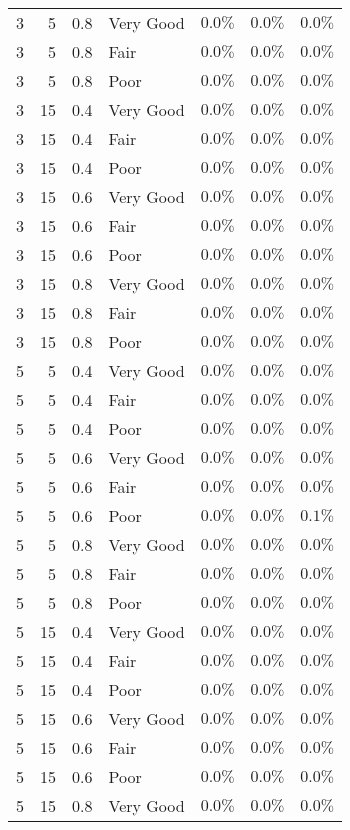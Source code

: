 \begin{longtable}{rrrlrrr}
3 & 5 & 0.8 & Very Good & $0.0\%$ & $0.0\%$ & $0.0\%$ \\ 
3 & 5 & 0.8 & Fair & $0.0\%$ & $0.0\%$ & $0.0\%$ \\ 
3 & 5 & 0.8 & Poor & $0.0\%$ & $0.0\%$ & $0.0\%$ \\ 
3 & 15 & 0.4 & Very Good & $0.0\%$ & $0.0\%$ & $0.0\%$ \\ 
3 & 15 & 0.4 & Fair & $0.0\%$ & $0.0\%$ & $0.0\%$ \\ 
3 & 15 & 0.4 & Poor & $0.0\%$ & $0.0\%$ & $0.0\%$ \\ 
3 & 15 & 0.6 & Very Good & $0.0\%$ & $0.0\%$ & $0.0\%$ \\ 
3 & 15 & 0.6 & Fair & $0.0\%$ & $0.0\%$ & $0.0\%$ \\ 
3 & 15 & 0.6 & Poor & $0.0\%$ & $0.0\%$ & $0.0\%$ \\ 
3 & 15 & 0.8 & Very Good & $0.0\%$ & $0.0\%$ & $0.0\%$ \\ 
3 & 15 & 0.8 & Fair & $0.0\%$ & $0.0\%$ & $0.0\%$ \\ 
3 & 15 & 0.8 & Poor & $0.0\%$ & $0.0\%$ & $0.0\%$ \\ 
5 & 5 & 0.4 & Very Good & $0.0\%$ & $0.0\%$ & $0.0\%$ \\ 
5 & 5 & 0.4 & Fair & $0.0\%$ & $0.0\%$ & $0.0\%$ \\ 
5 & 5 & 0.4 & Poor & $0.0\%$ & $0.0\%$ & $0.0\%$ \\ 
5 & 5 & 0.6 & Very Good & $0.0\%$ & $0.0\%$ & $0.0\%$ \\ 
5 & 5 & 0.6 & Fair & $0.0\%$ & $0.0\%$ & $0.0\%$ \\ 
5 & 5 & 0.6 & Poor & $0.0\%$ & $0.0\%$ & $0.1\%$ \\ 
5 & 5 & 0.8 & Very Good & $0.0\%$ & $0.0\%$ & $0.0\%$ \\ 
5 & 5 & 0.8 & Fair & $0.0\%$ & $0.0\%$ & $0.0\%$ \\ 
5 & 5 & 0.8 & Poor & $0.0\%$ & $0.0\%$ & $0.0\%$ \\ 
5 & 15 & 0.4 & Very Good & $0.0\%$ & $0.0\%$ & $0.0\%$ \\ 
5 & 15 & 0.4 & Fair & $0.0\%$ & $0.0\%$ & $0.0\%$ \\ 
5 & 15 & 0.4 & Poor & $0.0\%$ & $0.0\%$ & $0.0\%$ \\ 
5 & 15 & 0.6 & Very Good & $0.0\%$ & $0.0\%$ & $0.0\%$ \\ 
5 & 15 & 0.6 & Fair & $0.0\%$ & $0.0\%$ & $0.0\%$ \\ 
5 & 15 & 0.6 & Poor & $0.0\%$ & $0.0\%$ & $0.0\%$ \\ 
5 & 15 & 0.8 & Very Good & $0.0\%$ & $0.0\%$ & $0.0\%$ \\ 

\end{longtable}
